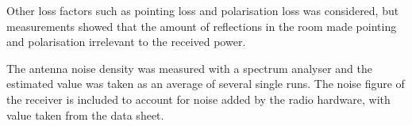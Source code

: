 Other loss factors such as pointing loss and polarisation loss was considered, but measurements showed that the amount of reflections in the room made pointing and polarisation irrelevant to the received power. 
 
The antenna noise density was measured with a spectrum analyser and the estimated value was taken as an average of several single runs. The noise figure of the receiver is included to account for noise added by the radio hardware, with value taken from the data sheet. 
